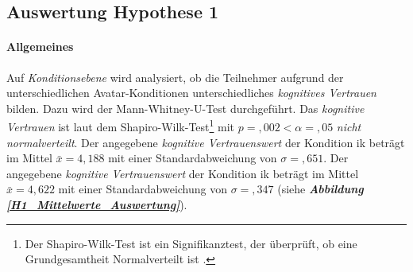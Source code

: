 \documentclass[a4paper,11pt]{article}%
\renewcommand{\\}{\vspace*{0.5\baselineskip} \newline}
\begin{document}
{%
%

\clearpage
\newpage	
	\subsection{Auswertung Hypothese 1}
	\label{Auswertung Hypothese 1}

\paragraph{Allgemeines}
Auf \textit{Konditionsebene} wird analysiert, ob die Teilnehmer aufgrund der unterschiedlichen Avatar-Konditionen unterschiedliches \textit{kognitives Vertrauen} bilden. Dazu wird der Mann-Whitney-U-Test durchgeführt.\\
Das \textit{kognitive Vertrauen} ist laut dem Shapiro-Wilk-Test\footnote{Der Shapiro-Wilk-Test ist ein Signifikanztest, der überprüft, ob eine Grundgesamtheit Normalverteilt ist \citep[S. 25]{razali2011power}.} mit $p =,002 < \alpha =,05$ \textit{nicht normalverteilt}.
Der angegebene \textit{kognitive Vertrauenswert} der Kondition \ac{ik} beträgt im Mittel $\bar{x} = 4,188$ mit einer Standardabweichung von $\sigma =,651$.\newline 
Der angegebene \textit{kognitive Vertrauenswert} der Kondition \ac{ik} beträgt im Mittel $\bar{x} = 4,622$ mit einer Standardabweichung von $\sigma =,347$ (siehe \textbf{\textit{Abbildung \ref{H1_Mittelwerte_Auswertung}}}).

}
\end{document}
